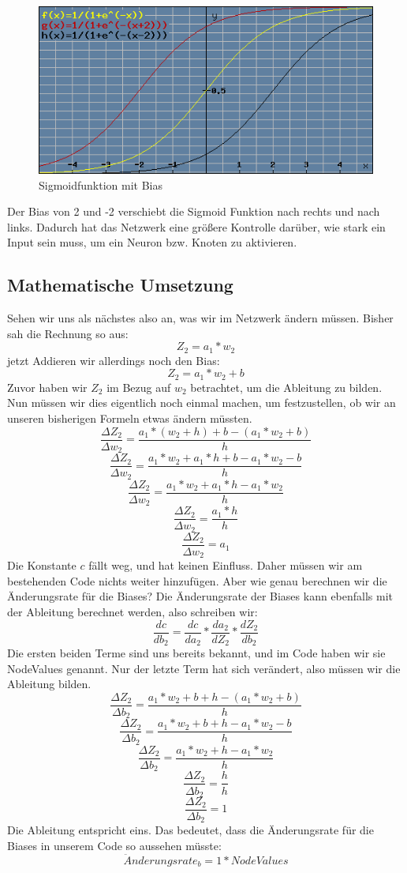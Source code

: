\documentclass[12pt]{article}
\begin{document}
\begin{figure}[H]
\centering
\includegraphics[scale=0.60]{./Images/Pasted image 20231005145933.png}
\caption{Sigmoidfunktion mit Bias}
\label{Sigmoidfunktion mit Bias}
\end{figure}
Der Bias von 2 und -2 verschiebt die Sigmoid Funktion nach rechts und nach links. Dadurch hat das Netzwerk eine größere Kontrolle darüber, wie stark ein Input sein muss, um ein Neuron bzw. Knoten zu aktivieren.\subsection{Mathematische Umsetzung}Sehen wir uns als nächstes also an, was wir im Netzwerk ändern müssen. Bisher sah die Rechnung so aus:$$Z_2 = a_1 * w_2$$jetzt Addieren wir allerdings noch den Bias: $$Z_2 = a_1 * w_2 + b$$
Zuvor haben wir $Z_2$ im Bezug auf $w_2$ betrachtet, um die Ableitung zu bilden. Nun müssen wir dies eigentlich noch einmal machen, um festzustellen, ob wir an unseren bisherigen Formeln etwas ändern müssten.
$$\frac{\Delta Z_2 }{\Delta w_2 } = \frac{ a_1 * (w_2+h) + b -(a_1 * w_2 + b) }{ h }$$
$$\frac{\Delta Z_2 }{\Delta w_2 } = \frac{ a_1*w_2+a_1*h + b -a_1 * w_2 - b }{ h }$$
$$\frac{\Delta Z_2 }{\Delta w_2 } = \frac{ a_1*w_2+a_1*h-a_1 * w_2 }{ h }$$
$$\frac{\Delta Z_2 }{\Delta w_2 } = \frac{a_1*h }{ h }$$
$$\frac{\Delta Z_2 }{\Delta w_2 } = a_1$$
Die Konstante $c$ fällt weg, und hat keinen Einfluss. Daher müssen wir am bestehenden Code nichts weiter hinzufügen. Aber wie genau berechnen wir die Änderungsrate für die Biases? Die Änderungsrate der Biases kann ebenfalls mit der Ableitung berechnet werden, also schreiben wir:
$$\frac{ dc }{ db_{ 2 } }=
\frac{ dc }{ da_{ 2 } }*
\frac{ da_{ 2 } }{ dZ_{ 2 } }*
\frac{ dZ_{ 2 } }{ db_{ 2 } }$$
Die ersten beiden Terme sind uns bereits bekannt, und im Code haben wir sie NodeValues genannt. Nur der letzte Term hat sich verändert, also müssen wir die Ableitung bilden.
$$\frac{\Delta Z_2 }{\Delta b_2 } = \frac{ a_1 * w_2 + b+h -(a_1 * w_2 + b) }{ h }$$
$$\frac{\Delta Z_2 }{\Delta b_2 } = \frac{ a_1 * w_2 + b+h -a_1 * w_2 - b }{ h }$$
$$\frac{\Delta Z_2 }{\Delta b_2 } = \frac{ a_1 * w_2 +h -a_1 * w_2 }{ h }$$
$$\frac{\Delta Z_2 }{\Delta b_2 } = \frac{ h  }{ h }$$
$$\frac{\Delta Z_2 }{\Delta b_2 } = 1$$
Die Ableitung entspricht eins. Das bedeutet, dass die Änderungsrate für die Biases in unserem Code so aussehen müsste:
$$\ddot{A}nderungsrate_b = 1*NodeValues$$
\end{document}
